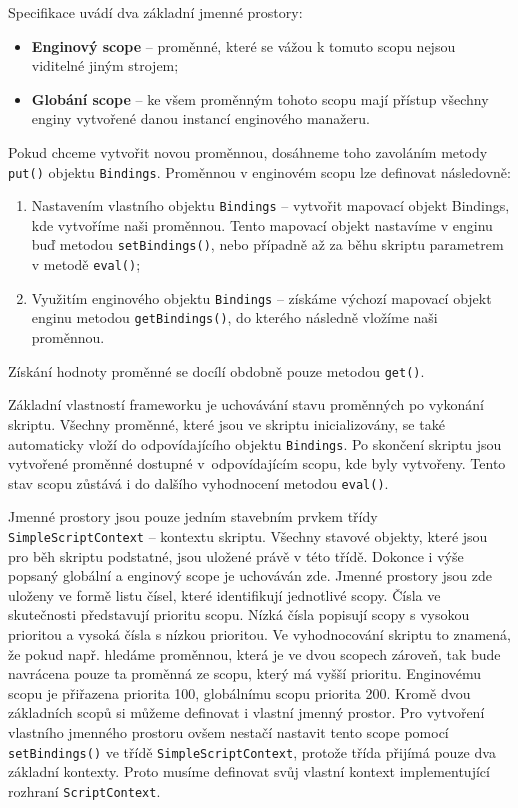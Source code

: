 \bigskip \noindent Specifikace uvádí dva základní jmenné prostory:

\begin{itemize}
  \item \textbf{Enginový scope} -- proměnné, které se vážou k tomuto scopu nejsou viditelné jiným strojem;
  \item \textbf{Globání scope} -- ke všem proměnným tohoto scopu mají přístup všechny enginy vytvořené danou instancí enginového manažeru.
\end{itemize}

Pokud chceme vytvořit novou proměnnou, dosáhneme toho zavoláním metody \texttt{put()} objektu \texttt{Bindings}. Proměnnou v enginovém scopu lze definovat následovně:

\begin{enumerate}
  \item Nastavením vlastního objektu \texttt{Bindings} -- vytvořit mapovací objekt Bindings, kde vytvoříme naši proměnnou. Tento mapovací objekt nastavíme v enginu buď metodou \texttt{setBindings()}, nebo případně až za běhu skriptu parametrem v metodě \texttt{eval()};
  \item Využitím enginového objektu \texttt{Bindings} -- získáme výchozí mapovací objekt enginu metodou \texttt{getBindings()}, do kterého následně vložíme naši proměnnou.
\end{enumerate}

Získání hodnoty proměnné se docílí obdobně pouze metodou \texttt{get()}.

Základní vlastností frameworku je uchovávání stavu proměnných po vykonání skriptu. Všechny proměnné, které jsou ve skriptu inicializovány, se také automaticky vloží do odpovídajícího objektu \texttt{Bindings}. Po skončení skriptu jsou vytvořené proměnné dostupné v~odpovídajícím scopu, kde byly vytvořeny. Tento stav scopu zůstává i do dalšího vyhodnocení metodou \texttt{eval()}.

Jmenné prostory jsou pouze jedním stavebním prvkem třídy \texttt{SimpleScriptContext} -- kontextu skriptu. Všechny stavové objekty, které jsou pro běh skriptu podstatné, jsou uložené právě v této třídě. Dokonce i výše popsaný globální a enginový scope je uchováván zde. Jmenné prostory jsou zde uloženy ve formě listu čísel, které identifikují jednotlivé scopy. Čísla ve skutečnosti představují prioritu scopu. Nízká čísla popisují scopy s vysokou prioritou a vysoká čísla s nízkou prioritou. Ve vyhodnocování skriptu to znamená, že pokud např. hledáme proměnnou, která je ve dvou scopech zároveň, tak bude navrácena pouze ta proměnná ze scopu, který má vyšší prioritu. Enginovému scopu je přiřazena priorita 100, globálnímu scopu priorita 200. Kromě dvou základních scopů si můžeme definovat i vlastní jmenný prostor. Pro vytvoření vlastního jmenného prostoru ovšem nestačí nastavit tento scope pomocí \texttt{setBindings()} ve třídě \texttt{SimpleScriptContext}, protože třída přijímá pouze dva základní kontexty. Proto musíme definovat svůj vlastní kontext implementující rozhraní \texttt{ScriptContext}.

